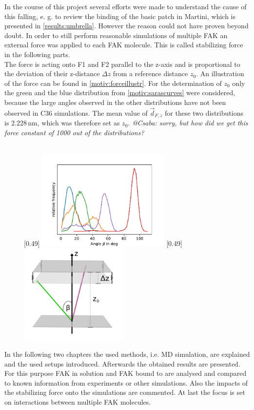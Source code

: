 In the course of this project several efforts were made to understand the cause of this falling, e. g. to review the binding of the basic patch in Martini, which is presented in \autoref{results:umbrella}. However the reason could not have proven beyond doubt. In order to still perform reasonable simulations of multiple FAK an external force was applied to each FAK molecule. This is called stabilizing force in the following parts.\\
The force is acting onto F1 and F2 parallel to the z-axis and is proportional to the deviation of their z-distance $\Delta z$ from a reference distance $z_0$. An illustration of the force can be found in \autoref{motiv:forceillustr}. For the determination of $z_0$ only the green and the blue distribution from \autoref{motiv:sarascurves} were considered, because the large angles observed in the other distributions have not been observed in C36 simulations. The mean value of $\vec{d}_{F, z}$ for these two distributions is $2.228\,\si{\nano\metre}$, which was therefore set as $z_0$. %
\textit{@Csaba: sorry, but how did we get this force constant of 1000 out of the distributions?}\\
\\
%
%
%
\begin{figure}
	\subcaptionbox{\label{motiv:sarascurves}}[0.49\textwidth]{
		\includegraphics[height=5cm]{figures/introduction/sara_angles}
	}\hfill%
	\subcaptionbox{\label{motiv:forceillustr}}[0.49\textwidth]{
		\includegraphics[height=5cm]{figures/introduction/forceapproach}
	}%
\end{figure}
%
%
%
In the following two chapters the used methods, i.e. MD simulation, are explained and the used setups introduced. Afterwards the obtained results are presented. For this purpose FAK in solution and FAK bound to \pip{} are analysed and compared to known information from experiments or other simulations. Also the impacts of the stabilizing force onto the simulations are commented. At last the focus is set on interactions between multiple FAK molecules.

